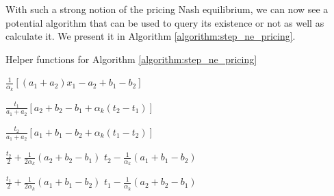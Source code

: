 \documentclass[10pt,a4paper]{book}
\theoremstyle{definition}
\theoremstyle{comment}
\begin{document}
With such a strong notion of the pricing Nash equilibrium, we can now see a potential algorithm that can be used to query its existence or not as well as calculate it.
We present it in Algorithm \ref{algorithm:step_ne_pricing}.

\begin{algorithm}
	\caption{Helper functions for Algorithm \ref{algorithm:step_ne_pricing}}
	\label{algorithm:step_helper_functions}
	\begin{algorithmic}[1]
		 \label{function:toll_diff}
		\State \Return $\frac{1}{\alpha_k}[(a_1 + a_2) x_1 - a_2 + b_1 - b_2]$
		\EndFunction

		\Statex
		 \label{function:profit_1}
		\State \Return $\frac{t_1}{a_1 + a_2} [a_2 + b_2 - b_1 + \alpha_k (t_2 - t_1)]$
		\EndFunction

		\Statex
		 \label{function:profit_2}
		\State \Return $\frac{t_2}{a_1 + a_2} [a_1 + b_1 - b_2 + \alpha_k (t_1 - t_2)]$
		\EndFunction

		\Statex
		 \label{function:best_response_1}
		\State \Return $\frac{t_2}{2} + \frac{1}{2 \alpha_k}(a_2 + b_2 - b_1)$
		\Else
		\State \Return $t_2 - \frac{1}{\alpha_k}(a_1 + b_1 - b_2)$
		\EndIf
		\EndFunction

		\Statex
		 \label{function:best_response_2}
		\State \Return $\frac{t_1}{2} + \frac{1}{2 \alpha_k}(a_1 + b_1 - b_2)$
		\Else
		\State \Return $t_1 - \frac{1}{\alpha_k}(a_2 + b_2 - b_1)$
		\EndIf
		\EndFunction
	\end{algorithmic}
\end{algorithm}
\end{document}
